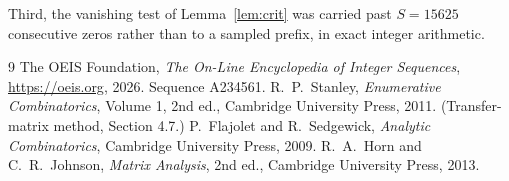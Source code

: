 \documentclass[11pt,a4paper]{article}
\theoremstyle{plain}
\theoremstyle{definition}
\begin{document}
Third, the vanishing test of Lemma~\ref{lem:crit} was carried past $S=15625$ consecutive
zeros rather than to a sampled prefix, in exact integer arithmetic.

\begin{thebibliography}{9}
 The OEIS Foundation, \emph{The On-Line Encyclopedia of Integer
Sequences}, \url{https://oeis.org}, 2026. Sequence A234561.
 R.~P.~Stanley, \emph{Enumerative Combinatorics}, Volume 1, 2nd ed.,
Cambridge University Press, 2011. (Transfer-matrix method, Section 4.7.)
 P.~Flajolet and R.~Sedgewick, \emph{Analytic Combinatorics}, Cambridge
University Press, 2009.
 R.~A.~Horn and C.~R.~Johnson, \emph{Matrix Analysis}, 2nd ed., Cambridge
University Press, 2013.
\end{thebibliography}
\end{document}

